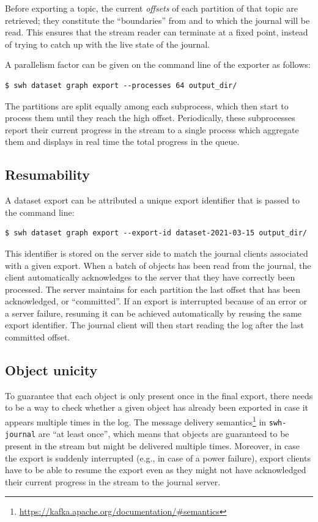 Before exporting a topic, the current \emph{offsets} of each partition of that
topic are retrieved; they constitute the ``boundaries'' from and to which the
journal will be read. This ensures that the stream reader can terminate at a
fixed point, instead of trying to catch up with the live state of the journal.

A parallelism factor can be given on the command line of the exporter as
follows:

\begin{verbatim}
$ swh dataset graph export --processes 64 output_dir/
\end{verbatim}

The partitions are split equally among each subprocess, which then start to
process them until they reach the high offset. Periodically, these subprocesses
report their current progress in the stream to a single process which aggregate
them and displays in real time the total progress in the queue.

\subsection{Resumability}

A dataset export can be attributed a unique export identifier that is passed
to the command line:

\begin{verbatim}
$ swh dataset graph export --export-id dataset-2021-03-15 output_dir/
\end{verbatim}

This identifier is stored on the server side to match the journal clients
associated with a given export.
When a batch of objects has been read from the journal, the client
automatically acknowledges to the server that they have correctly been
processed. The server maintains for each partition the last offset that has
been acknowledged, or ``committed''.
If an export is interrupted because of an error or a server failure, resuming
it can be achieved automatically by reusing the same export identifier. The
journal client will then start reading the log after the last committed offset.

\subsection{Object unicity}
\label{sec:dataset-export-unicity}

To guarantee that each object is only present once in the final export, there
needs to be a way to check whether a given object has already been exported in
case it appears multiple times in the log. The message delivery
semantics\footnote{\url{https://kafka.apache.org/documentation/\#semantics}} in
\texttt{swh-journal} are ``at least once'', which means that objects are
guaranteed to be present in the stream but might be delivered multiple times.
Moreover, in case the export is suddenly interrupted (e.g., in case of a power
failure), export clients have to be able to resume the export even as they
might not have acknowledged their current progress in the stream to the journal
server.

